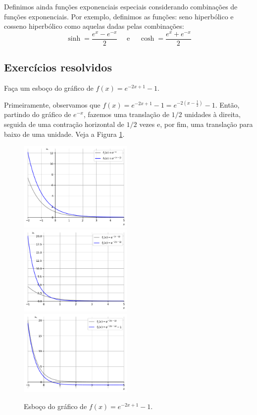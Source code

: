 \documentclass[../main.tex]{subfiles}
\begin{document}
Definimos ainda funções exponenciais especiais considerando combinações de funções 
exponenciais.  Por exemplo, definimos as funções: seno hiperbólico e cosseno hiperbólico como aquelas dadas pelas combinações:
\begin{equation}
    \sinh=\frac{e^x-e^{-x}}{2}\quad\textrm{ e  } \quad \cosh=\frac{e^x+e^{-x}}{2}
\end{equation}
\subsection{Exercícios resolvidos}
\begin{exeresol}
  Faça um esboço do gráfico de $f(x) = e^{-2x+1}-1$.
\end{exeresol}
\begin{resol}
Primeiramente, observamos que $f(x) = e^{-2x+1}-1 = e^{-2\left(x-\frac{1}{2}\right)}-1$. Então, partindo do gráfico de $e^{-x}$, fazemos uma translação de $1/2$ unidades à direita, seguida de uma contração horizontal de $1/2$ vezes e, por fim, uma translação para baixo de uma unidade. Veja a Figura \ref{fig:exeresol_funexp_graf}.

  \begin{figure}[htb]
    \centering
    \includegraphics[width=0.49\textwidth]{fig_func/fig_exeresol_funexp_graf_1}~
    \includegraphics[width=0.49\textwidth]{fig_func/fig_exeresol_funexp_graf_2}\\
    \includegraphics[width=0.49\textwidth]{fig_func/fig_exeresol_funexp_graf_3}
    \caption{Esboço do gráfico de $f(x) = e^{-2x+1}-1$.}
    \label{fig:exeresol_funexp_graf}
  \end{figure}
\end{resol}
\end{document}
